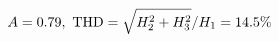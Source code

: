 \documentclass[preview]{standalone}
\begin{document}
\begin{align*}
\special{dvisvgm:raw <g id='unique000'>}A=0.79,\ \text{THD}=\sqrt{H_2^2+H_3^2}/H_1=14.5\%\special{dvisvgm:raw </g>}
\end{align*}
\end{document}
